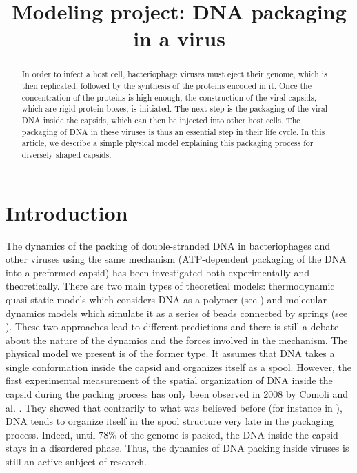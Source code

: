 \documentclass{article}
\title{Modeling project: DNA packaging in a virus}
\author{}
\date{}
\begin{document}
\maketitle

\begin{abstract}
\noindent
In order to infect a host cell, bacteriophage viruses must eject their genome, which is then replicated, followed by the synthesis of the proteins encoded in it. Once the concentration of the proteins is high enough, the construction of the viral capsids, which are rigid protein boxes, is initiated. The next step is the packaging of the viral DNA inside the capsids, which can then be injected into other host cells. The packaging of DNA in these viruses is thus an essential step in their life cycle. In this article, we describe a simple physical model explaining this packaging process for diversely shaped capsids. 
\end{abstract}


\section{Introduction}
The dynamics of the packing of double-stranded DNA in bacteriophages and other viruses using the same mechanism (ATP-dependent packaging of the DNA into a preformed capsid) has been investigated both experimentally and theoretically. There are two main types of theoretical models: thermodynamic quasi-static models which considers DNA as a polymer (see \cite{phillips2005}) and molecular dynamics models which simulate it as a series of beads connected by springs (see \cite{Petrov2008}). These two approaches lead to different predictions and there is still a debate about the nature of the dynamics and the forces involved in the mechanism.\cite{Berndsen2014} The physical model we present is of the former type. It assumes that DNA takes a single conformation inside the capsid and organizes itself as a spool. However, the first experimental measurement of the spatial organization of DNA inside the capsid during the packing process has only been observed in 2008 by Comoli and al. \cite{comoli2008}. They showed that contrarily to what was believed before (for instance in \cite{phillips2005, purohit2003}), DNA tends to organize itself in the spool structure very late in the packaging process. Indeed, until $78\%$ of the genome is packed, the DNA inside the capsid stays in a disordered phase. Thus, the dynamics of DNA packing inside viruses is still an active subject of research. 
\end{document}
